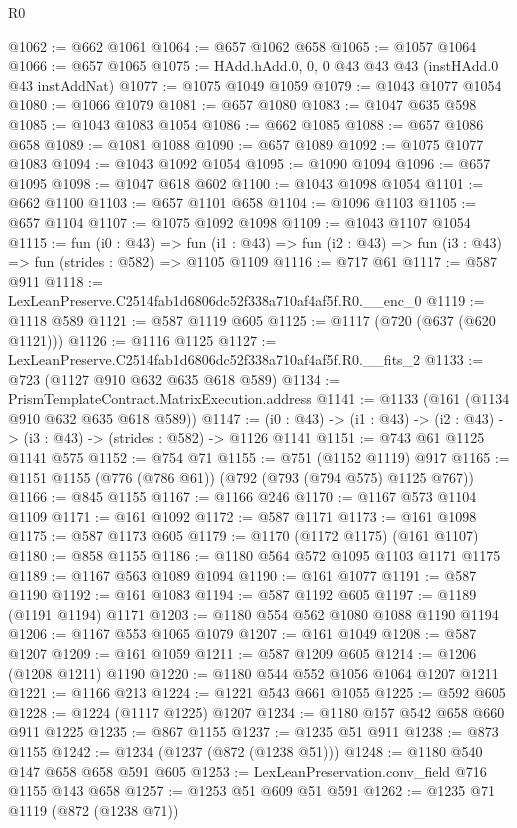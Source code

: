 \begin{lexlean}{R0}
\begin{coremodule}
@1062 := @662 @1061
@1064 := @657 @1062 @658
@1065 := @1057 @1064
@1066 := @657 @1065
@1075 := HAdd.hAdd.{0, 0, 0} @43 @43 @43 (instHAdd.{0} @43 instAddNat)
@1077 := @1075 @1049 @1059
@1079 := @1043 @1077 @1054
@1080 := @1066 @1079
@1081 := @657 @1080
@1083 := @1047 @635 @598
@1085 := @1043 @1083 @1054
@1086 := @662 @1085
@1088 := @657 @1086 @658
@1089 := @1081 @1088
@1090 := @657 @1089
@1092 := @1075 @1077 @1083
@1094 := @1043 @1092 @1054
@1095 := @1090 @1094
@1096 := @657 @1095
@1098 := @1047 @618 @602
@1100 := @1043 @1098 @1054
@1101 := @662 @1100
@1103 := @657 @1101 @658
@1104 := @1096 @1103
@1105 := @657 @1104
@1107 := @1075 @1092 @1098
@1109 := @1043 @1107 @1054
@1115 := fun (i0 : @43) =>
  fun (i1 : @43) => fun (i2 : @43) => fun (i3 : @43) => fun (strides : @582) => @1105 @1109
@1116 := @717 @61
@1117 := @587 @911
@1118 := LexLeanPreserve.C2514fab1d6806dc52f338a710af4af5f.R0.__enc_0
@1119 := @1118 @589
@1121 := @587 @1119 @605
@1125 := @1117 (@720 (@637 (@620 @1121)))
@1126 := @1116 @1125
@1127 := LexLeanPreserve.C2514fab1d6806dc52f338a710af4af5f.R0.__fits_2
@1133 := @723 (@1127 @910 @632 @635 @618 @589)
@1134 := PrismTemplateContract.MatrixExecution.address
@1141 := @1133 (@161 (@1134 @910 @632 @635 @618 @589))
@1147 := (i0 : @43) -> (i1 : @43) -> (i2 : @43) -> (i3 : @43) -> (strides : @582) -> @1126 @1141
@1151 := @743 @61 @1125 @1141 @575
@1152 := @754 @71
@1155 := @751 (@1152 @1119) @917
@1165 := @1151 @1155 (@776 (@786 @61)) (@792 (@793 (@794 @575) @1125 @767))
@1166 := @845 @1155
@1167 := @1166 @246
@1170 := @1167 @573 @1104 @1109
@1171 := @161 @1092
@1172 := @587 @1171
@1173 := @161 @1098
@1175 := @587 @1173 @605
@1179 := @1170 (@1172 @1175) (@161 @1107)
@1180 := @858 @1155
@1186 := @1180 @564 @572 @1095 @1103 @1171 @1175
@1189 := @1167 @563 @1089 @1094
@1190 := @161 @1077
@1191 := @587 @1190
@1192 := @161 @1083
@1194 := @587 @1192 @605
@1197 := @1189 (@1191 @1194) @1171
@1203 := @1180 @554 @562 @1080 @1088 @1190 @1194
@1206 := @1167 @553 @1065 @1079
@1207 := @161 @1049
@1208 := @587 @1207
@1209 := @161 @1059
@1211 := @587 @1209 @605
@1214 := @1206 (@1208 @1211) @1190
@1220 := @1180 @544 @552 @1056 @1064 @1207 @1211
@1221 := @1166 @213
@1224 := @1221 @543 @661 @1055
@1225 := @592 @605
@1228 := @1224 (@1117 @1225) @1207
@1234 := @1180 @157 @542 @658 @660 @911 @1225
@1235 := @867 @1155
@1237 := @1235 @51 @911
@1238 := @873 @1155
@1242 := @1234 (@1237 (@872 (@1238 @51)))
@1248 := @1180 @540 @147 @658 @658 @591 @605
@1253 := LexLeanPreservation.conv_field @716 @1155 @143 @658
@1257 := @1253 @51 @609 @51 @591
@1262 := @1235 @71 @1119 (@872 (@1238 @71))

\end{coremodule}
\end{lexlean}
